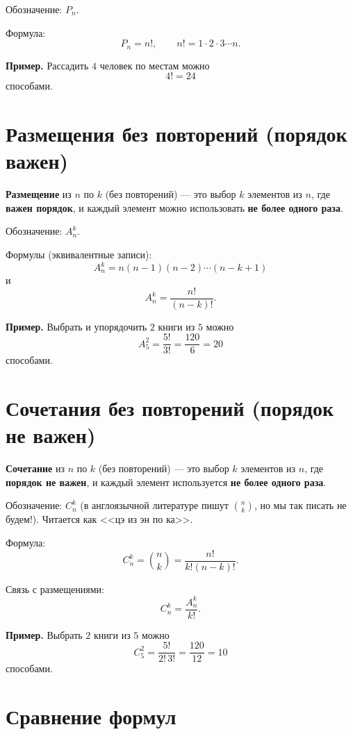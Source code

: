 Обозначение: $P_n$.

Формула:
\[
P_n = n!,
\qquad
n! = 1\cdot 2\cdot 3\cdots n.
\]

\textbf{Пример.} Рассадить $4$ человек по местам можно
\[
4! = 24
\]
способами.


\newpage

\hspace{3mm}

\section{Размещения без повторений (порядок важен)}

\textbf{Размещение} из $n$ по $k$ (без повторений) — это выбор $k$ элементов из $n$,
где \textbf{важен порядок}, и каждый элемент можно использовать \textbf{не более одного раза}.

Обозначение: $A_n^k$.

Формулы (эквивалентные записи):
\[
A_n^k = n(n-1)(n-2)\cdots(n-k+1)
\]
и
\[
A_n^k = \frac{n!}{(n-k)!}.
\]

\textbf{Пример.} Выбрать и упорядочить $2$ книги из $5$ можно
\[
A_5^2=\frac{5!}{3!}=\frac{120}{6}=20
\]
способами.


\newpage

\hspace{3mm}

\section{Сочетания без повторений (порядок не важен)}

\textbf{Сочетание} из $n$ по $k$ (без повторений) — это выбор $k$ элементов из $n$,
где \textbf{порядок не важен}, и каждый элемент используется \textbf{не более одного раза}.

Обозначение: $C_n^k$ (в англоязычной литературе пишут $\binom{n}{k}$, но мы так писать не будем!). Читается как <<цэ из эн по ка>>.

Формула:
\[
C_n^k = \binom{n}{k} = \frac{n!}{k!(n-k)!}.
\]

Связь с размещениями:
\[
C_n^k = \frac{A_n^k}{k!}.
\]

\textbf{Пример.} Выбрать $2$ книги из $5$ можно
\[
C_5^2=\frac{5!}{2!\,3!}=\frac{120}{12}=10
\]
способами.


\newpage

\hspace{3mm}

\section{Сравнение формул}

